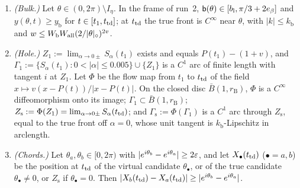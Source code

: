 \begin{lemma}\label{lem:bulk}
\begin{enumerate}
\item[(a)] \emph{(Bulk.)} Let $\theta\in(0,2\pi)\setminus I_\eta$. In the frame of run~2, $\mathsf b(\theta)\in[b_{\mathrm l},\pi/3+2e_\beta]$
and $y(\theta,t)\ge y_{\mathrm b}$ for $t\in[t_1,t_{\mathrm{td}}]$; at $t_{\mathrm{td}}$ the true front is $C^\infty$ near $\theta$, with $|k|\le k_{\mathrm b}$
and $w\le W_{\mathrm b}W_{\mathrm{all}}(2/|\theta|_\circ)^{2v}$.
\item[(b)] \emph{(Hole.)} $Z_1:=\lim_{\alpha\to0\pm}S_\alpha(t_1)$ exists and equals $P(t_1)-(1+v)$, and
$\Gamma_1:=\{S_\alpha(t_1):0<|\alpha|\le0.005\}\cup\{Z_1\}$ is a $C^1$ arc of finite length with tangent $i$ at $Z_1$. Let $\Phi$ be
the flow map from $t_1$ to $t_{\mathrm{td}}$ of the field $x\mapsto v(x-P(t))/|x-P(t)|$. On the closed disc $\bar B(1,r_{\mathrm B})$, $\Phi$ is a
$C^\infty$ diffeomorphism onto its image; $\Gamma_1\subset\bar B(1,r_{\mathrm B})$; $Z_{\mathrm s}:=\Phi(Z_1)=\lim_{\alpha\to0\pm}S_\alpha(t_{\mathrm{td}})$;
and $\Gamma_{\mathrm s}:=\Phi(\Gamma_1)$ is a $C^1$ arc through $Z_{\mathrm s}$, equal to the true front off $\alpha=0$, whose unit
tangent is $k_{\mathrm b}$-Lipschitz in arclength.
\item[(c)] \emph{(Chords.)} Let $\theta_a,\theta_b\in[0,2\pi)$ with $|e^{i\theta_b}-e^{i\theta_a}|\ge2\varepsilon$, and let $X_\bullet(t_{\mathrm{td}})$
($\bullet=a,b$) be the position at $t_{\mathrm{td}}$ of the virtual candidate $\theta_\bullet$, or of the true candidate $\theta_\bullet\ne0$, or
$Z_{\mathrm s}$ if $\theta_\bullet=0$. Then $|X_b(t_{\mathrm{td}})-X_a(t_{\mathrm{td}})|\ge|e^{i\theta_b}-e^{i\theta_a}|$.
\end{enumerate}
\end{lemma}

